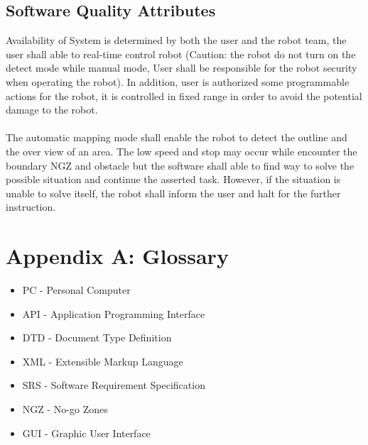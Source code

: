 \documentclass[11pt, a4paper]{article}
\begin{document}
\subsection{Software Quality Attributes}
Availability of System is determined by both the user and the robot team, the user shall able to real-time control robot (Caution: the robot do not turn on the detect mode while manual mode, User shall be responsible for the robot security when operating the robot).  In addition, user is authorized some programmable actions for the robot, it is controlled in fixed range in order to avoid the potential damage to the robot.\\    
\\
The automatic mapping mode shall enable the robot to detect the outline and the over view of an area.  The low speed and stop may occur while encounter the boundary NGZ and obstacle but the software shall able to find way to solve the possible situation and continue the asserted task. However, if the situation is unable to solve itself, the robot shall inform the user and halt for the further instruction.


\section*{Appendix A: Glossary}
\begin{itemize}
\item {PC - }Personal Computer\\
\item {API - }Application Programming Interface\\
\item {DTD - }Document Type Definition\\
\item {XML - }Extensible Markup Language\\
\item {SRS - }Software Requirement Specification\\
\item {NGZ - }No-go Zones\\
\item {GUI - }Graphic User Interface\\
\end{itemize}
\end{document}
